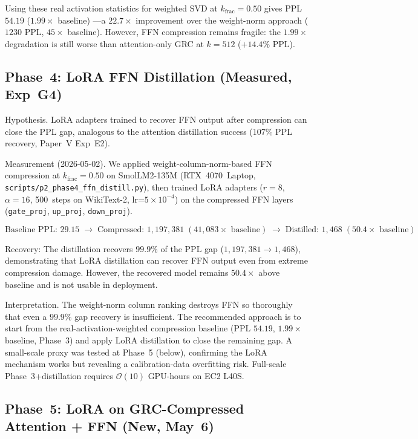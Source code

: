 \documentclass[11pt]{article}
\begin{document}
Using these real activation statistics for weighted SVD at
$k_\text{frac}{=}0.50$ gives PPL $54.19$
($1.99{\times}$ baseline) ---a $22.7{\times}$ improvement
over the weight-norm approach ($1230$ PPL, $45{\times}$ baseline).  However,
FFN compression remains fragile: the $1.99{\times}$ degradation is still
worse than attention-only GRC at $k{=}512$ ($+14.4\%$ PPL).

\subsection{Phase~4: LoRA FFN Distillation (Measured, Exp~G4)}

Hypothesis.  LoRA adapters trained to recover FFN output after
compression can close the PPL gap, analogous to the attention
distillation success ($107\%$ PPL recovery, Paper~V Exp~E2).

Measurement (2026-05-02).  We applied weight-column-norm-based
FFN compression at $k_\text{frac}{=}0.50$ on SmolLM2-135M (RTX~4070~Laptop,
\texttt{scripts/p2\_phase4\_ffn\_distill.py}), then trained LoRA adapters
($r{=}8$, $\alpha{=}16$, 500~steps on WikiText-2, lr=$5{\times}10^{-4}$)
on the compressed FFN layers (\texttt{gate\_proj}, \texttt{up\_proj},
\texttt{down\_proj}).

\[
\text{Baseline PPL: } 29.15 \;\rightarrow\;
\text{Compressed: } 1{,}197{,}381 \; (41{,}083{\times}\text{ baseline}) \;\rightarrow\;
\text{Distilled: } 1{,468} \; (50.4{\times}\text{ baseline})
\]

Recovery:  The distillation recovers $99.9\%$ of the
PPL gap ($1{,}197{,}381\to 1{,}468$), demonstrating that LoRA distillation
can recover FFN output even from extreme compression damage.
However, the recovered model remains $50.4{\times}$ above baseline
and is not usable in deployment.

Interpretation.  The weight-norm column ranking destroys FFN
so thoroughly that even a $99.9\%$ gap recovery is insufficient.
The recommended approach is to start from the real-activation-weighted
compression baseline (PPL $54.19$, $1.99{\times}$ baseline, Phase~3)
and apply LoRA distillation to close the remaining gap.  A small-scale
proxy was tested at Phase~5 (below), confirming the LoRA mechanism
works but revealing a calibration-data overfitting risk.  Full-scale
Phase~3+distillation requires $\mathcal{O}(10)$ GPU-hours on EC2 L40S.

\subsection{Phase~5: LoRA on GRC-Compressed Attention + FFN (New, May~6)}
\end{document}
